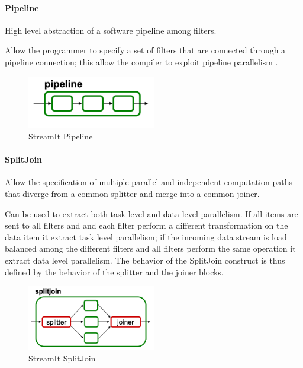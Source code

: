 \documentclass[../main.tex]{subfiles}
\begin{document}
\paragraph{Pipeline}
High level abstraction of a software pipeline among filters.

Allow the programmer to specify a set of filters that are connected through a pipeline connection; this allow the compiler to exploit pipeline parallelism \cite{streamit3}.

\begin{figure}[h!]
  \includegraphics[width=0.5\textwidth]{images/StreamItPipeline.png}
  \centering
  \caption{StreamIt Pipeline}
  \label{fig:pipeline}
\end{figure}

\paragraph{SplitJoin}
Allow the specification of multiple parallel and independent computation paths that diverge from a common splitter and merge into a common joiner.

\newpage

Can be used to extract both task level and data level parallelism. 
If all items are sent to all filters and and each filter perform a different transformation on the data item it extract task level parallelism; if the incoming data stream is load balanced among the different filters and all filters perform the same operation it extract data level parallelism. The behavior of the SplitJoin construct is thus defined by the behavior of the splitter and the joiner blocks.

\begin{figure}[h!]
  \includegraphics[width=0.5\textwidth]{images/StreamItSplitJoin.png}
  \centering
  \caption{StreamIt SplitJoin}
  \label{fig:splitjoin}
\end{figure}
\end{document}
